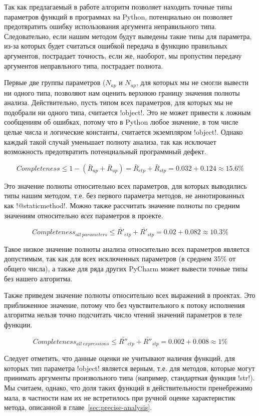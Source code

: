 Так как предлагаемый в работе алгоритм позволяет находить точные типы параметров
функций в программах на Python, потенциально он позволяет предотвратить ошибку
использования аргумента неправильного типа. Следовательно, если нашим
методом будут выведены такие типы для параметра, из-за которых будет считаться
ошибкой передача в функцию правильных аргументов, пострадает точность, если же,
наоборот, мы пропустим передачу аргументов неправльного типа, пострадает
полнота.

Первые две группы параметров ($N_{ap}$ и $N_{up}$, для которых мы не смогли
вывести ни одного типа, позволяют нам оценить верхнюю границу значения полноты
анализа. Действительно, пусть типом всех параметров, для которых мы не подобрали
ни одного типа, считается !object!. Это не может привести к ложным сообщениям об
ошибках, потому что в Python любое значение, в том числе целые числа и
логические константы, считается экземпляром !object!. Однако каждый такой случай
уменьшает полноту анализа, так как исключает возможность предотвратить
потенциальный программный дефект. 

\[
  Completeness \le 1 - (\bar{R}_{ap} + \bar{R}_{up}) = \bar{R}_{etp} +
  \bar{R}_{stp} = 0.032 + 0.124 \approx 15.6\%
\]

Это значение полноты относительно всех параметров, для которых выводились типы
нашим методом, т.е. без первого параметра методов, не аннотированных как
!@staticmethod!. Можно также рассчитать значение полноты по средним значениям
относительно \emph{всех} параметров в проекте.

\[
  Completeness_{all~parameters} \le \bar{R'}_{etp} + \bar{R'}_{stp} = 0.02 + 0.082 \approx 10.3\% 
\]

Такое низкое значение полноты анализа относительно всех параметров является
допустимым, так как для всех исключенных параметров (в среднем 35\% от общего
числа), а также для ряда других PyCharm может вывести точные типы без нашего
алгоритма.

Также приведем значение полноты относительно всех выражений в проектах. Это
приближенное значение, потому что без чувствительного к потоку исполнения
алгоритма нельзя точно подсчитать число чтений значений параметров в
теле функции.

\[
  Completeness_{all~expressions} \le \bar{R''}_{etp} + \bar{R''}_{stp} = 0.002
  + 0.008 \approx 1\% 
\]

Следует отметить, что данные оценки не учитывают наличия функций, для которых
тип параметра !object! является верным, т.е. для методов, которые могут
принимать аргументы произвольного типа (например, стандартная функция !str!). Мы
считаем, однако, что доля таких функций в действительности пренебрежимо мала, в
частности нам их не встретилось при ручной оценке характеристик метода,
описанной в главе~\ref{sec:precise-analysis}.

